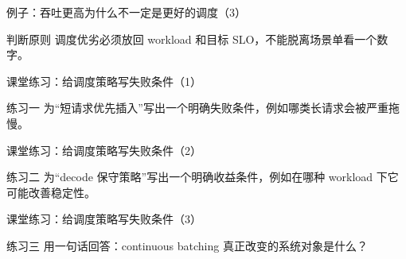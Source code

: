 \begin{frame}{例子：吞吐更高为什么不一定是更好的调度（3）}
\begin{block}{判断原则}
    调度优劣必须放回 workload 和目标 SLO，不能脱离场景单看一个数字。
  \end{block}
\end{frame}

\begin{frame}{课堂练习：给调度策略写失败条件（1）}
\begin{block}{练习一}
    为“短请求优先插入”写出一个明确失败条件，例如哪类长请求会被严重拖慢。
  \end{block}
\end{frame}

\begin{frame}{课堂练习：给调度策略写失败条件（2）}
\begin{block}{练习二}
    为“decode 保守策略”写出一个明确收益条件，例如在哪种 workload 下它可能改善稳定性。
  \end{block}
\end{frame}

\begin{frame}{课堂练习：给调度策略写失败条件（3）}
\begin{block}{练习三}
    用一句话回答：continuous batching 真正改变的系统对象是什么？
  \end{block}
\end{frame}
